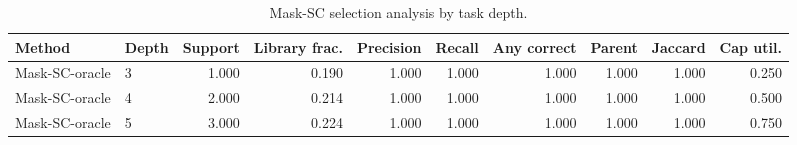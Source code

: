 \begin{table}[ht]
    \caption{Mask-SC selection analysis by task depth.}
    \label{tbl:masksc_selection_depth}
    \centering
    \scriptsize
    \begin{tabular}{llrrrrrrrr}
    \toprule
Method & Depth & Support & Library frac. & Precision & Recall & Any correct & Parent & Jaccard & Cap util. \\
    \midrule
Mask-SC-oracle & 3 & 1.000 & 0.190 & 1.000 & 1.000 & 1.000 & 1.000 & 1.000 & 0.250 \\
Mask-SC-oracle & 4 & 2.000 & 0.214 & 1.000 & 1.000 & 1.000 & 1.000 & 1.000 & 0.500 \\
Mask-SC-oracle & 5 & 3.000 & 0.224 & 1.000 & 1.000 & 1.000 & 1.000 & 1.000 & 0.750 \\
    \bottomrule
    \end{tabular}
\end{table}
